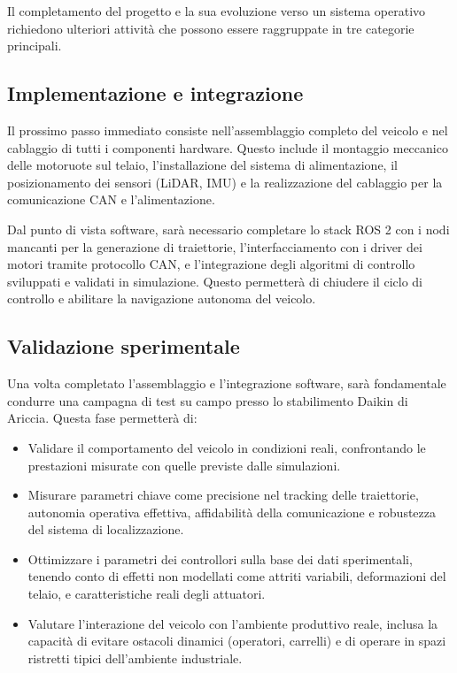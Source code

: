 Il completamento del progetto e la sua evoluzione verso un sistema operativo richiedono ulteriori attività che possono essere raggruppate in tre categorie principali.

\subsection{Implementazione e integrazione}

Il prossimo passo immediato consiste nell'assemblaggio completo del veicolo e nel cablaggio di tutti i componenti hardware. Questo include il montaggio meccanico delle motoruote sul telaio, l'installazione del sistema di alimentazione, il posizionamento dei sensori (LiDAR, IMU) e la realizzazione del cablaggio per la comunicazione CAN e l'alimentazione.

Dal punto di vista software, sarà necessario completare lo stack ROS 2 con i nodi mancanti per la generazione di traiettorie, l'interfacciamento con i driver dei motori tramite protocollo CAN, e l'integrazione degli algoritmi di controllo sviluppati e validati in simulazione. Questo permetterà di chiudere il ciclo di controllo e abilitare la navigazione autonoma del veicolo.

\subsection{Validazione sperimentale}

Una volta completato l'assemblaggio e l'integrazione software, sarà fondamentale condurre una campagna di test su campo presso lo stabilimento Daikin di Ariccia. Questa fase permetterà di:

\begin{itemize}
    \item Validare il comportamento del veicolo in condizioni reali, confrontando le prestazioni misurate con quelle previste dalle simulazioni.
    \item Misurare parametri chiave come precisione nel tracking delle traiettorie, autonomia operativa effettiva, affidabilità della comunicazione e robustezza del sistema di localizzazione.
    \item Ottimizzare i parametri dei controllori sulla base dei dati sperimentali, tenendo conto di effetti non modellati come attriti variabili, deformazioni del telaio, e caratteristiche reali degli attuatori.
    \item Valutare l'interazione del veicolo con l'ambiente produttivo reale, inclusa la capacità di evitare ostacoli dinamici (operatori, carrelli) e di operare in spazi ristretti tipici dell'ambiente industriale.
\end{itemize}

